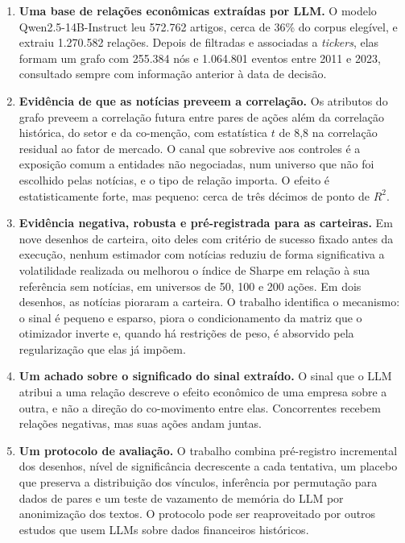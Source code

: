 \begin{enumerate}
  \item \textbf{Uma base de relações econômicas extraídas por LLM.} O modelo Qwen2.5-14B-Instruct
        \citep{qwen2024} leu 572.762 artigos, cerca de 36\% do corpus elegível, e extraiu 1.270.582
        relações. Depois de filtradas e associadas a \emph{tickers}, elas formam um grafo com 255.384
        nós e 1.064.801 eventos entre 2011 e 2023, consultado sempre com informação anterior à data
        de decisão.
  \item \textbf{Evidência de que as notícias preveem a correlação.} Os atributos do grafo preveem a
        correlação futura entre pares de ações além da correlação histórica, do setor e da co-menção,
        com estatística $t$ de 8,8 na correlação residual ao fator de mercado. O canal que
        sobrevive aos controles é a exposição comum a entidades não negociadas, num universo que não
        foi escolhido pelas notícias, e o tipo de relação importa. O efeito é estatisticamente forte, mas pequeno:
        cerca de três décimos de ponto de $R^2$.
  \item \textbf{Evidência negativa, robusta e pré-registrada para as carteiras.} Em nove desenhos de
        carteira, oito deles com critério de sucesso fixado antes da execução, nenhum estimador com
        notícias reduziu de forma significativa a volatilidade realizada ou melhorou o índice de Sharpe
        em relação à sua referência sem notícias, em universos de 50, 100 e 200 ações. Em dois desenhos,
        as notícias pioraram a carteira. O trabalho identifica o mecanismo: o sinal é pequeno e esparso,
        piora o condicionamento da matriz que o otimizador inverte e, quando há restrições de peso,
        é absorvido pela regularização que elas já impõem.
  \item \textbf{Um achado sobre o significado do sinal extraído.} O sinal que o LLM atribui a uma
        relação descreve o efeito econômico de uma empresa sobre a outra, e não a direção do
        co-movimento entre elas. Concorrentes recebem relações negativas, mas suas ações andam juntas.
  \item \textbf{Um protocolo de avaliação.} O trabalho combina pré-registro incremental dos desenhos,
        nível de significância decrescente a cada tentativa, um placebo que preserva a distribuição dos
        vínculos, inferência por permutação para dados de pares e um teste de vazamento de memória do
        LLM por anonimização dos textos. O protocolo pode ser reaproveitado por outros estudos que usem LLMs
        sobre dados financeiros históricos.
\end{enumerate}

